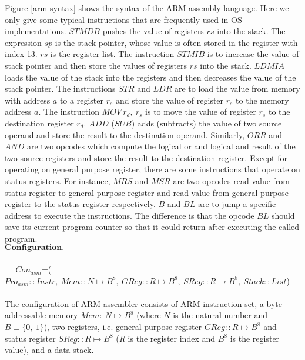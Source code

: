 \documentclass[letterpaper, 10 pt, conference]{IEEEtran}
\begin{document}
\par Figure \ref{arm-syntax} shows the syntax of the ARM assembly language. Here we only give some typical instructions that are frequently used in OS implementations. $STMDB$ pushes the value of registers $rs$ into the stack. The expression $sp$ is the stack pointer, whose value is often stored in the register with index 13. $rs$ is the register list. The instruction $STMIB$ is to increase the value of stack pointer and then store the values of registers $rs$ into the stack. $LDMIA$ loads the value of the stack into the registers and then decreases the value of the stack pointer. The instructions $STR$ and $LDR$ are to load the value from memory with address $a$ to a register $r_s$ and store the value of register $r_s$ to the memory address $a$. The instruction $MOV~r_d,~r_s$ is to move the value of register $r_s$ to the destination register $r_d$. $ADD$ ($SUB$) adds (subtracts) the value of two source operand and store the result to the destination operand. Similarly, $ORR$ and $AND$ are two opcodes which compute the logical or and logical and result of the two source registers and store the result to the destination register. Except for operating on general purpose register, there are some instructions that operate on status registers. For instance, $MRS$ and $MSR$ are two opcodes read value from status register to general purpose register and read value from general purpose register to the status register respectively. $B$ and $BL$ are to jump a specific address to execute the instructions. The difference is that the opcode $BL$ should save its current program counter so that it could return after executing the called program.\\

$\textbf{Configuration.}$\\ \\
$~~~~~~$$Con_{asm}$=($Pro_{asm}::Instr,~Mem::N\mapsto B^8,~GReg::\textit{R}\mapsto B^8,~SReg::\textit{R}\mapsto B^8,~Stack::List$)\\ \\

The configuration of ARM assembler consists of ARM instruction set, a byte-addressable memory $Mem:~N\mapsto B^8$ (where $N$ is the natural number and $B\equiv \{0,~1\}$), two registers, i.e. general purpose register $GReg::\textit{R}\mapsto B^8$ and status register $SReg::\textit{R}\mapsto B^8$ (\textit{R} is the register index and $B^8$ is the register value), and a data stack.\\
\end{document}
